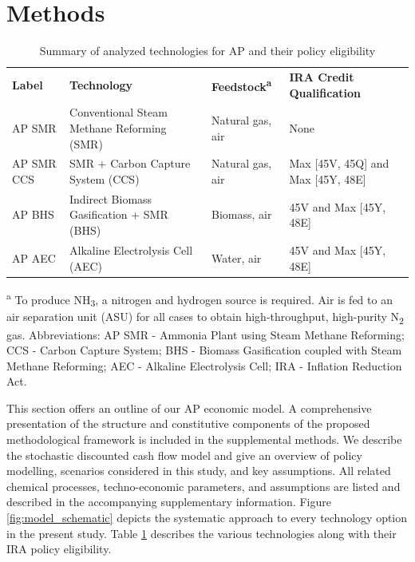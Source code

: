 \documentclass{article}
\begin{document}
\section*{Methods}

\begin{table}[H]
  \centering
  \caption{Summary of analyzed technologies for AP and their policy eligibility}
  \label{tab:technologies}
    \begin{tabular}{@{}p{2.5cm}p{4cm}p{3.5cm}p{5cm}@{}}
    \toprule
    \textbf{Label}       & \textbf{Technology}                                & \textbf{Feedstock\textsuperscript{a}} & \textbf{IRA Credit Qualification} \\
    AP SMR               & Conventional Steam Methane Reforming (SMR)         & Natural gas, air                      & None                              \\
    AP SMR CCS           & SMR + Carbon Capture System (CCS)                  & Natural gas, air                      & Max [45V, 45Q] and Max [45Y, 48E] \\
    AP BHS               & Indirect Biomass Gasification + SMR (BHS)           & Biomass, air                          & 45V and Max [45Y, 48E]            \\
    AP AEC               & Alkaline Electrolysis Cell (AEC)                   & Water, air                            & 45V and Max [45Y, 48E]            \\ \bottomrule
  \end{tabular}
  \begin{tablenotes}
    \footnotesize
    \item \textsuperscript{a} To produce NH\textsubscript{3}, a nitrogen and hydrogen source is required. Air is fed to an air separation unit (ASU) for all cases to obtain high-throughput, high-purity N\textsubscript{2} gas. Abbreviations: AP SMR - Ammonia Plant using Steam Methane Reforming; CCS - Carbon Capture System; BHS - Biomass Gasification coupled with Steam Methane Reforming; AEC - Alkaline Electrolysis Cell; IRA - Inflation Reduction Act.
  \end{tablenotes}
\end{table}


This section offers an outline of our AP economic model. A comprehensive presentation of the structure and constitutive components of the proposed methodological framework is included in the supplemental methods. We describe the stochastic  discounted cash flow model and give an overview of policy modelling, scenarios considered in this study, and key assumptions. All related chemical processes, techno-economic parameters, and assumptions are listed and described in the accompanying supplementary information. Figure \ref{fig:model_schematic} depicts the systematic approach to every technology option in the present study. Table \ref{tab:technologies} describes the various technologies along with their IRA policy eligibility. 
\end{document}
